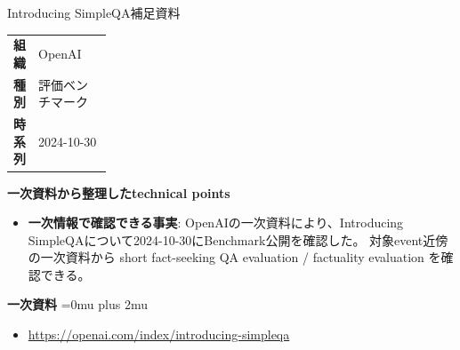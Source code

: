 \begin{technicalnote}{Introducing SimpleQA}{補足資料}
\begingroup
\begin{tabularx}{\linewidth}{@{}>{\bfseries}p{0.22\linewidth}X@{}}
組織 & OpenAI \\
種別 & 評価ベンチマーク \\
時系列 & 2024-10-30 \\
\end{tabularx}
\smallskip
{\bfseries 一次資料から整理したtechnical points}
\begin{itemize}[leftmargin=1.5em,itemsep=0.35em]
\item \textbf{一次情報で確認できる事実}: OpenAIの一次資料により、Introducing SimpleQAについて2024-10-30にBenchmark公開を確認した。 対象event近傍の一次資料から short fact-seeking QA evaluation / factuality evaluation を確認できる。
\end{itemize}
\begin{minipage}{\linewidth}
\begin{samepage}
{\bfseries 一次資料}
\begingroup\sloppy
\Urlmuskip=0mu plus 2mu\relax
\begin{itemize}[leftmargin=1.5em,itemsep=0.25em]
\item {\scriptsize\url{https://openai.com/index/introducing-simpleqa}}
\end{itemize}
\endgroup
\end{samepage}
\end{minipage}
\endgroup
\end{technicalnote}
\medskip
